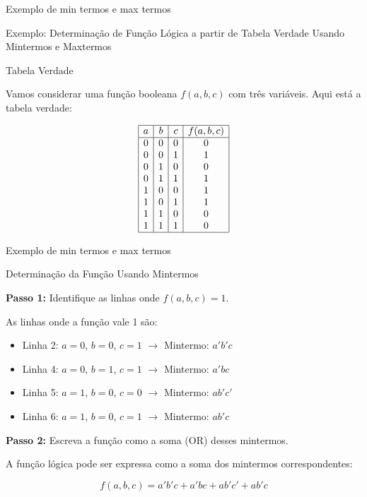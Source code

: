 	\begin{frame}{Exemplo de min termos e max termos}
		\par Exemplo: Determinação de Função Lógica a partir de Tabela Verdade Usando Mintermos e Maxtermos
		
		\par{Tabela Verdade}
		
		\par Vamos considerar uma função booleana \(f(a, b, c)\) com três variáveis. Aqui está a tabela verdade:
		
		\[
		\begin{array}{|c|c|c|c|}
			\hline
			a & b & c & f(a, b, c) \\
			\hline
			0 & 0 & 0 & 0 \\
			0 & 0 & 1 & 1 \\
			0 & 1 & 0 & 0 \\
			0 & 1 & 1 & 1 \\
			1 & 0 & 0 & 1 \\
			1 & 0 & 1 & 1 \\
			1 & 1 & 0 & 0 \\
			1 & 1 & 1 & 0 \\
			\hline
		\end{array}
		\]
	\end{frame}
	
	\begin{frame}{Exemplo de min termos e max termos}
		\par{Determinação da Função Usando Mintermos}
		
		\textbf{Passo 1:} Identifique as linhas onde \(f(a, b, c) = 1\).
		
		\par As linhas onde a função vale 1 são:
		\begin{itemize}
			\item Linha 2: \(a = 0\), \(b = 0\), \(c = 1\)  \(\rightarrow\) Mintermo: \(a'b'c\)
			\item Linha 4: \(a = 0\), \(b = 1\), \(c = 1\)  \(\rightarrow\) Mintermo: \(a'bc\)
			\item Linha 5: \(a = 1\), \(b = 0\), \(c = 0\)  \(\rightarrow\) Mintermo: \(ab'c'\)
			\item Linha 6: \(a = 1\), \(b = 0\), \(c = 1\)  \(\rightarrow\) Mintermo: \(ab'c\)
		\end{itemize}
		
		\textbf{Passo 2:} Escreva a função como a soma (OR) desses mintermos.
		
		A função lógica pode ser expressa como a soma dos mintermos correspondentes:
		
		\[
		f(a, b, c) = a'b'c + a'bc + ab'c' + ab'c
		\]
	\end{frame}
	
